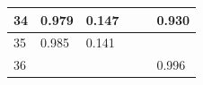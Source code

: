 \begin{longtable}{l|l|l|l|l|l}
34 & 0.979                                                                                                                              & 0.147                                                                        &                                                                              &                                                                 & 0.930                                                                                               \\ \hline
35 & 0.985                                                                                                                              & 0.141                                                                        &                                                                              &                                                                 &                                                                                                     \\ \hline
36 &                                                                                                                                    &                                                                              &                                                                              &                                                                 & 0.996                                                                                               \\ \hline


\end{longtable}
